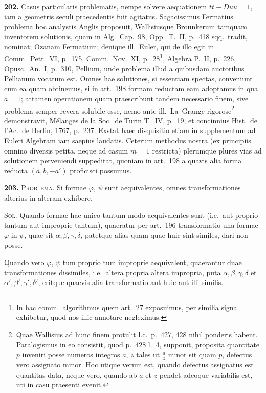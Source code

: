 \documentclass[12pt,a4paper]{article}
\theoremstyle{plain}
\theoremstyle{definition}
\theoremstyle{remark}
\begin{document}
\textbf{202.}
Casus particularis problematis, nempe solvere aequationem $tt-Duu=1$, iam a geometris seculi praecedentis fuit agitatus. Sagacissimus Fermatius problema hoc analystis Anglis proposuit, Wallisiusque Brounkerum tamquam inventorem solutionis, quam in Alg.\ Cap.~98, Opp.\ T.~II, p.~418 sqq.\ tradit, nominat; Ozanam Fermatium; denique ill.~Euler, qui de illo egit in Comm.\ Petr.\ VI, p.~175, Comm.\ Nov.\ XI, p.~28\footnote{In hac comm.\ algorithmus quem art.~27 exposuimus, per similia signa exhibetur, quod nos illic annotare negleximus.}, Algebra P.~II, p.~226, Opusc.\ An.\ I, p.~310, Pellium, unde problema illud a quibusdam auctoribus Pellianum vocatum est. Omnes hae solutiones, si essentiam spectas, conveniunt cum ea quam obtinemus, si in art.~198 formam reductam eam adoptamus in qua $a=1$; attamen operationem quam praescribunt tandem necessario finem, sive problema semper revera solubile esse, nemo ante ill.~La~Grange rigorose\footnote{Quae Wallisius ad hunc finem protulit l.c.\ p.~427, 428 nihil ponderis habent. Paralogismus in eo consistit, quod p.~428 l.~4, supponit, proposita quantitate $p$ inveniri posse numeros integros $a$, $z$ tales ut $\frac{a}{z}$ minor sit quam $p$, defectus vero assignato minor. Hoc utique verum est, quando defectus assignatus est quantitas data, neque vero, quando ab $a$ et $z$ pendet adeoque variabilis est, uti in casu praesenti evenit.} demonstravit, M\'elanges de la Soc.\ de Turin T.~IV, p.~19, et concinnius Hist.\ de l'Ac.\ de Berlin, 1767, p.~237. Exstat haec disquisitio etiam in supplementum ad Euleri Algebram iam saepius laudatis. Ceterum methodus nostra (ex principiis omnino diversis petita, neque ad casum $m=1$ restricta) plerumque plures vias ad solutionem perveniendi suppeditat, quoniam in art.~198 a quavis alia forma reducta $(a,b,-a')$ proficisci possumus.

\textbf{203.} \textsc{Problema.} Si formae $\varphi$, $\psi$ sunt aequivalentes, omnes transformationes alterius in alteram exhibere.

\textsc{Sol.} Quando formae hae unico tantum modo aequivalentes sunt (i.e.\ aut proprio tantum aut improprie tantum), quaeratur per art.~196 transformatio una formae $\varphi$ in $\psi$, quae sit $\alpha,\beta,\gamma,\delta$, patetque alias quam quae huic sint similes, dari non posse.

Quando vero $\varphi$, $\psi$ tum proprio tum improprie aequivalent, quaerantur duae transformationes dissimiles, i.e.\ altera propria altera impropria, puta $\alpha,\beta,\gamma,\delta$ et $\alpha',\beta',\gamma',\delta'$, eritque quaevis alia transformatio aut huic aut illi similis.
\end{document}

